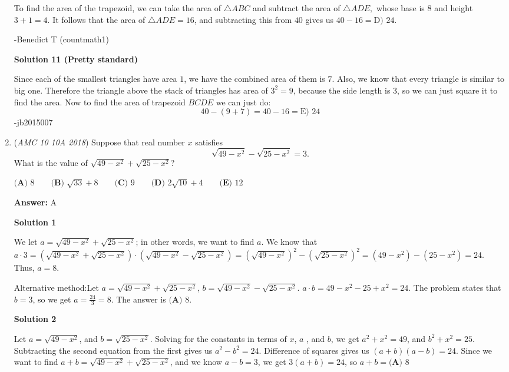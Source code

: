 \begin{enumerate}
 To find the area of the trapezoid, we can take the area of $\triangle{ABC}$ and subtract the area of $\triangle{ADE},$ whose base is $8$ and height $3+1=4$. It follows that the area of $\triangle{ADE}=16$, and subtracting this from $40$ gives us $40-16=\boxed{\text{D) }24}$.

 -Benedict T (countmath1)

 



\textbf{Solution 11 (Pretty standard)}

Since each of the smallest triangles have area $1$, we have the combined area of them is $7$. Also, we know that every triangle is similar to big one. Therefore the triangle above the stack of triangles has area of $3^2 = 9$, because the side length is $3$, so we can just square it to find the area. Now to find the area of trapezoid $BCDE$ we can just do: 
 \[40-(9+7) = 40-16=\boxed{\text{E) }24}\]-jb2015007

 


 


	\item (\textit{AMC 10 10A 2018}) Suppose that real number $x$ satisfies 
 \[\sqrt{49-x^2}-\sqrt{25-x^2}=3.\] What is the value of $\sqrt{49-x^2}+\sqrt{25-x^2}$?


 $\textbf{(A) }8 \qquad \textbf{(B) }\sqrt{33}+8\qquad \textbf{(C) }9 \qquad \textbf{(D) }2\sqrt{10}+4 \qquad \textbf{(E) }12 \qquad$

 \textbf{Answer: }A



\textbf{Solution 1}

We let $a=\sqrt{49-x^2}+\sqrt{25-x^2}$; in other words, we want to find $a$. We know that $a\cdot3=\left(\sqrt{49-x^2}+\sqrt{25-x^2}\right)\cdot\left(\sqrt{49-x^2}-\sqrt{25-x^2}\right)=\left(\sqrt{49-x^2}\right)^2-\left(\sqrt{25-x^2}\right)^2=\left(49-x^2\right)-\left(25-x^2\right)=24.$ Thus, $a=\boxed{8}$. 

 Alternative method:Let $a=\sqrt{49-x^2}+\sqrt{25-x^2}$, $b=\sqrt{49-x^2}-\sqrt{25-x^2}$. $a \cdot b=49-x^2 - 25 + x^2 = 24$. The problem states that $b=3$, so we get $a = \frac{24}{3} = 8$. The answer is $\boxed{\textbf{(A) }8}$.

 



\textbf{Solution 2}

Let $a = \sqrt{49-x^2}$, and $b = \sqrt{25-x^2}$. Solving for the constants in terms of $x$, $a$ , and $b$, we get $a^2 + x^2 = 49$, and $b^2 + x^2 = 25$. Subtracting the second equation from the first gives us $a^2 - b^2 = 24$. Difference of squares gives us $(a+b)(a-b) = 24$. Since we want to find $a+b = \sqrt{49-x^2}+\sqrt{25-x^2}$, and we know $a-b = 3$, we get $3(a+b) = 24$, so $a+b = \boxed{\textbf{(A) }8}$





\end{enumerate}
